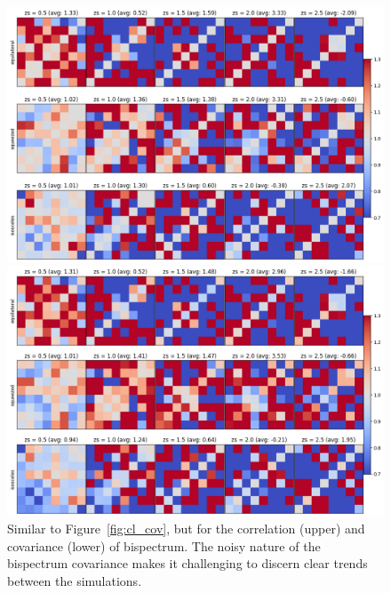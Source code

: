 \begin{figure}[p]
    \centering
    \includegraphics[width=\textwidth]{figures/results/bl_corr.png}
    \caption[Bispectrum Correlation and Covariance]{Similar to Figure~\ref{fig:cl_cov}, but for the correlation (upper) and covariance (lower) of bispectrum. The noisy nature of the bispectrum covariance makes it challenging to discern clear trends between the simulations.}
    \label{fig:bl_cov}
    \vspace{0.5cm}
    \includegraphics[width=\textwidth]{figures/results/bl_cov.png}
\end{figure}

